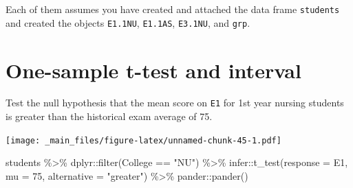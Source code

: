 \documentclass[
]{book}
\newenvironment{Shaded}{\begin{snugshade}}{\end{snugshade}}
\newcommand{\AttributeTok}[1]{\textcolor[rgb]{0.77,0.63,0.00}{#1}}
\newcommand{\DecValTok}[1]{\textcolor[rgb]{0.00,0.00,0.81}{#1}}
\newcommand{\FunctionTok}[1]{\textcolor[rgb]{0.00,0.00,0.00}{#1}}
\newcommand{\NormalTok}[1]{#1}
\newcommand{\SpecialCharTok}[1]{\textcolor[rgb]{0.00,0.00,0.00}{#1}}
\newcommand{\StringTok}[1]{\textcolor[rgb]{0.31,0.60,0.02}{#1}}
\begin{document}
Each of them assumes you have created and attached the data frame \texttt{students} and created the objects \texttt{E1.1NU}, \texttt{E1.1AS}, \texttt{E3.1NU}, and \texttt{grp}.

\hypertarget{one-sample-t-test}{%
\section{One-sample t-test and interval}\label{one-sample-t-test}}

Test the null hypothesis that the mean score on \texttt{E1} for 1st year nursing students is greater than the historical exam average of 75.

\texttt{[image: \_main\_files/figure-latex/unnamed-chunk-45-1.pdf]}

\begin{Shaded}
\begin{Highlighting}[]
\NormalTok{students }\SpecialCharTok{\%\textgreater{}\%} 
\NormalTok{  dplyr}\SpecialCharTok{::}\FunctionTok{filter}\NormalTok{(College }\SpecialCharTok{==} \StringTok{"NU"}\NormalTok{) }\SpecialCharTok{\%\textgreater{}\%} 
\NormalTok{  infer}\SpecialCharTok{::}\FunctionTok{t\_test}\NormalTok{(}\AttributeTok{response =}\NormalTok{ E1, }\AttributeTok{mu =} \DecValTok{75}\NormalTok{, }\AttributeTok{alternative =} \StringTok{"greater"}\NormalTok{) }\SpecialCharTok{\%\textgreater{}\%} 
\NormalTok{  pander}\SpecialCharTok{::}\FunctionTok{pander}\NormalTok{()}
\end{Highlighting}
\end{Shaded}
\end{document}
